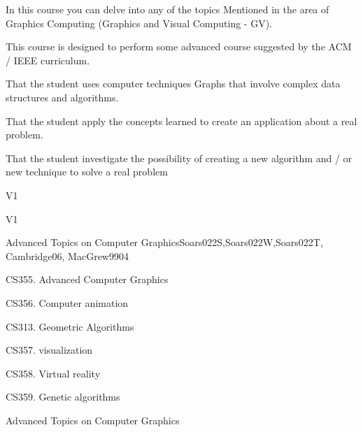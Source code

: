 \begin{syllabus}


\begin{justification}
In this course you can delve into any of the topics
Mentioned in the area of Graphics Computing (Graphics and Visual Computing - GV).

This course is designed to perform some advanced course suggested by the ACM / IEEE curriculum. \cite{Foley13,Hearn90}
\end{justification}

\begin{goals}
\item That the student uses computer techniques Graphs that involve complex data structures and algorithms.
\item That the student apply the concepts learned to create an application about a real problem.
\item That the student investigate the possibility of creating a new algorithm and / or new technique to solve a real problem
\end{goals}

\begin{outcomes}{V1}
    \item {}
    \item {}
    \item {}
    \item {}
\end{outcomes}

\begin{competences}{V1}
    \item {}
    \item {}
\end{competences}

\begin{unit}{Advanced Topics on Computer Graphics}{}{Soars022S,Soars022W,Soars022T, Cambridge06, MacGrew99}{0}{4}
   \begin{topics}
      \item CS355. Advanced Computer Graphics
      \item CS356. Computer animation
      \item CS313. Geometric Algorithms
      \item CS357. visualization
      \item CS358. Virtual reality
      \item CS359. Genetic algorithms
   \end{topics}

   \begin{learningoutcomes}
      \item Advanced Topics on Computer Graphics
   \end{learningoutcomes}
\end{unit}

\begin{coursebibliography}
\end{coursebibliography}

\end{syllabus}
